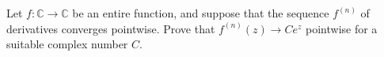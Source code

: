 Let $f:\mathbb{C} \to \mathbb{C}$ be an entire function, and suppose that the sequence $f^{(n)}$ of derivatives converges pointwise. Prove that $f^{(n)}(z)\to  Ce^z$ pointwise for a suitable complex number $C$.